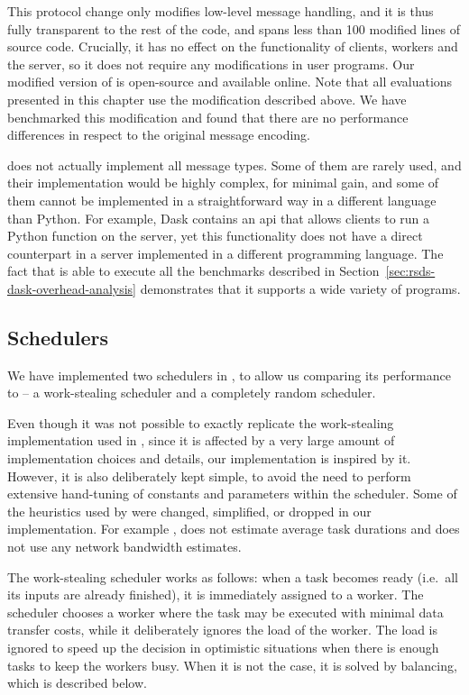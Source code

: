 This protocol change only modifies low-level message handling, and it is thus fully transparent to
the rest of the code, and spans less than 100 modified lines of \dask{} source
code. Crucially, it has no effect on the functionality of clients, workers and the server, so it
does not require any modifications in \dask{} user programs. Our modified
version of \dask{} is open-source and available
online. Note that all evaluations presented in this chapter use the
modification described above. We have benchmarked this modification and found that there are no
performance differences in respect to the original \dask{} message encoding.

\rsds{} does not actually implement all \dask{} message
types. Some of them are rarely used, and their implementation would be highly complex, for minimal
gain, and some of them cannot be implemented in a straightforward way in a different language than
Python. For example, Dask contains an \gls{api} that allows clients to run a
Python function on the server, yet this functionality does not have a direct counterpart in a
server implemented in a different programming language. The fact that \rsds{}
is able to execute all the benchmarks described in Section~\ref{sec:rsds-dask-overhead-analysis} demonstrates
that it supports a wide variety of \dask{} programs.

\subsection*{Schedulers}
We have implemented two schedulers in \rsds{}, to allow us comparing its
performance to \dask{} -- a work-stealing scheduler and a completely random
scheduler.

Even though it was not possible to exactly replicate the work-stealing implementation used in
\dask{}, since it is affected by a very large amount of implementation choices
and details, our implementation is inspired by it. However, it is also deliberately kept simple, to
avoid the need to perform extensive hand-tuning of constants and parameters within the scheduler.
Some of the heuristics used by \dask{} were changed, simplified, or dropped in
our implementation. For example \rsds{}, does not estimate average task
durations and does not use any network bandwidth estimates.

The \rsds{} work-stealing scheduler works as follows: when a task becomes ready
(i.e.\ all its inputs are already finished), it is immediately assigned to a worker. The scheduler
chooses a worker where the task may be executed with minimal data transfer costs, while it
deliberately ignores the load of the worker. The load is ignored to speed up the decision in
optimistic situations when there is enough tasks to keep the workers busy. When it is not the case,
it is solved by balancing, which is described below.

